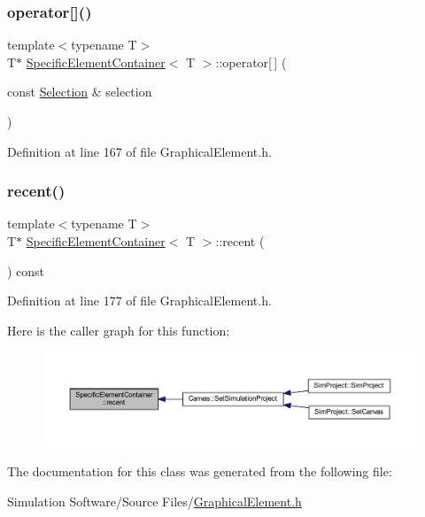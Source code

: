 \subsubsection{\texorpdfstring{operator[]()}{operator[]()}\hspace{0.1cm}{\footnotesize\ttfamily [2/2]}}
{\footnotesize\ttfamily template$<$typename T$>$ \\
T$\ast$ \hyperlink{class_specific_element_container}{Specific\+Element\+Container}$<$ T $>$\+::operator\mbox{[}$\,$\mbox{]} (\begin{DoxyParamCaption}\item[{const \hyperlink{struct_selection}{Selection} \&}]{selection }\end{DoxyParamCaption})\hspace{0.3cm}{\ttfamily [inline]}}



Definition at line 167 of file Graphical\+Element.\+h.

\mbox{\label{class_specific_element_container_a700ee4826baf3ab9735c2ae5c52bcaf3}} 
\subsubsection{\texorpdfstring{recent()}{recent()}}
{\footnotesize\ttfamily template$<$typename T$>$ \\
T$\ast$ \hyperlink{class_specific_element_container}{Specific\+Element\+Container}$<$ T $>$\+::recent (\begin{DoxyParamCaption}{ }\end{DoxyParamCaption}) const\hspace{0.3cm}{\ttfamily [inline]}}



Definition at line 177 of file Graphical\+Element.\+h.

Here is the caller graph for this function\+:
\nopagebreak
\begin{figure}[H]
\begin{center}
\leavevmode
\includegraphics[width=350pt]{class_specific_element_container_a700ee4826baf3ab9735c2ae5c52bcaf3_icgraph}
\end{center}
\end{figure}


The documentation for this class was generated from the following file\+:\begin{DoxyCompactItemize}
\item 
Simulation Software/\+Source Files/\hyperlink{_graphical_element_8h}{Graphical\+Element.\+h}\end{DoxyCompactItemize}
